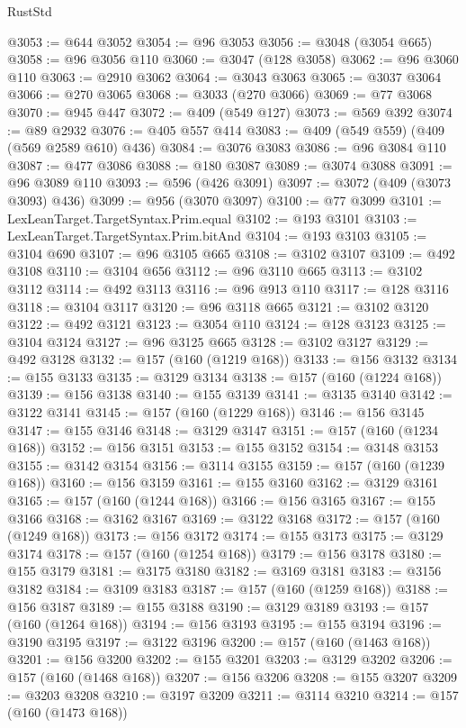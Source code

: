 \begin{lexlean}{RustStd}
\begin{coremodule}
{\begin{coremodule}
{{{{{{{{{{{{{{{{{{{{{{{{{{{{{{{{{{{{{{{{{{{{{{{{{{{{{{{{{{{{@3053 := @644 @3052
@3054 := @96 @3053
@3056 := @3048 (@3054 @665)
@3058 := @96 @3056 @110
@3060 := @3047 (@128 @3058)
@3062 := @96 @3060 @110
@3063 := @2910 @3062
@3064 := @3043 @3063
@3065 := @3037 @3064
@3066 := @270 @3065
@3068 := @3033 (@270 @3066)
@3069 := @77 @3068
@3070 := @945 @447
@3072 := @409 (@549 @127)
@3073 := @569 @392
@3074 := @89 @2932
@3076 := @405 @557 @414
@3083 := @409 (@549 @559) (@409 (@569 @2589 @610) @436)
@3084 := @3076 @3083
@3086 := @96 @3084 @110
@3087 := @477 @3086
@3088 := @180 @3087
@3089 := @3074 @3088
@3091 := @96 @3089 @110
@3093 := @596 (@426 @3091)
@3097 := @3072 (@409 (@3073 @3093) @436)
@3099 := @956 (@3070 @3097)
@3100 := @77 @3099
@3101 := LexLeanTarget.TargetSyntax.Prim.equal
@3102 := @193 @3101
@3103 := LexLeanTarget.TargetSyntax.Prim.bitAnd
@3104 := @193 @3103
@3105 := @3104 @690
@3107 := @96 @3105 @665
@3108 := @3102 @3107
@3109 := @492 @3108
@3110 := @3104 @656
@3112 := @96 @3110 @665
@3113 := @3102 @3112
@3114 := @492 @3113
@3116 := @96 @913 @110
@3117 := @128 @3116
@3118 := @3104 @3117
@3120 := @96 @3118 @665
@3121 := @3102 @3120
@3122 := @492 @3121
@3123 := @3054 @110
@3124 := @128 @3123
@3125 := @3104 @3124
@3127 := @96 @3125 @665
@3128 := @3102 @3127
@3129 := @492 @3128
@3132 := @157 (@160 (@1219 @168))
@3133 := @156 @3132
@3134 := @155 @3133
@3135 := @3129 @3134
@3138 := @157 (@160 (@1224 @168))
@3139 := @156 @3138
@3140 := @155 @3139
@3141 := @3135 @3140
@3142 := @3122 @3141
@3145 := @157 (@160 (@1229 @168))
@3146 := @156 @3145
@3147 := @155 @3146
@3148 := @3129 @3147
@3151 := @157 (@160 (@1234 @168))
@3152 := @156 @3151
@3153 := @155 @3152
@3154 := @3148 @3153
@3155 := @3142 @3154
@3156 := @3114 @3155
@3159 := @157 (@160 (@1239 @168))
@3160 := @156 @3159
@3161 := @155 @3160
@3162 := @3129 @3161
@3165 := @157 (@160 (@1244 @168))
@3166 := @156 @3165
@3167 := @155 @3166
@3168 := @3162 @3167
@3169 := @3122 @3168
@3172 := @157 (@160 (@1249 @168))
@3173 := @156 @3172
@3174 := @155 @3173
@3175 := @3129 @3174
@3178 := @157 (@160 (@1254 @168))
@3179 := @156 @3178
@3180 := @155 @3179
@3181 := @3175 @3180
@3182 := @3169 @3181
@3183 := @3156 @3182
@3184 := @3109 @3183
@3187 := @157 (@160 (@1259 @168))
@3188 := @156 @3187
@3189 := @155 @3188
@3190 := @3129 @3189
@3193 := @157 (@160 (@1264 @168))
@3194 := @156 @3193
@3195 := @155 @3194
@3196 := @3190 @3195
@3197 := @3122 @3196
@3200 := @157 (@160 (@1463 @168))
@3201 := @156 @3200
@3202 := @155 @3201
@3203 := @3129 @3202
@3206 := @157 (@160 (@1468 @168))
@3207 := @156 @3206
@3208 := @155 @3207
@3209 := @3203 @3208
@3210 := @3197 @3209
@3211 := @3114 @3210
@3214 := @157 (@160 (@1473 @168))
}}}}}}}}}}}}}}}}}}}}}}}}}}}}}}}}}}}}}}}}}}}}}}}}}}}}}}}}}}}}
\end{coremodule}}
\end{coremodule}
\end{lexlean}
